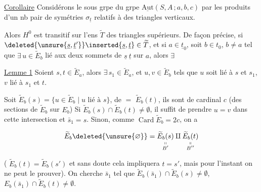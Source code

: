 \uline{Corollaire} Considérons le sous grpe  du grpe  $\underline{\mathrm{Aut}}(S,A\,;a,b,c)$   par les produits d'un nb pair de symétries $\sigma_{\underline t}$ relatifs à des triangles verticaux.

Alors $H^0$ est transitif sur l'ens $\widetilde T$ des triangles supérieurs. De façon précise, si $\deleted{\unsure{\underline s,\underline t'}}\inserted{\underline s,\underline t}\in\widetilde T$, et si $a\in\underline t_0$, soit  $b\in t_0$, $b\neq a$ tel que $\exists\,u\in\widetilde E_b$ lié aux deux sommets  de $\underline s\ \underline t$ sur $a$, alors $\exists$



\uline{Lemme 1}  Soient $s,t\in\widetilde E_a$, alors $\exists\,s_1\in\widetilde E_a$, et $u,v\in\widetilde E_b$ tels que $u$ soit lié à $s$ et $s_1$, $v$ lié à $s_1$ et $t$.


Soit $\widetilde E_{b}(s)=\{u\in\widetilde E_b\mid u\text{ lié à }s\}$, de $=$ $\widetilde E_b(t)$, ils sont de cardinal $c$ (des sections de $\widetilde E_b$ sur $E_b$) Si $\widetilde E_b(s)\cap\widetilde E_b(t)\neq\emptyset$, il suffit de prendre $u=v$  dans cette intersection et $\bar s_1=s$. Sinon, comme $\operatorname{Card}\widetilde E_b=2c$, on a

\[ \widetilde E_b\deleted{\unsure{\varnothing}}=\underset{\substack{\shortparallel\\ B'}}{\widetilde E_b(s)}\amalg\underset{\substack{\shortparallel\\ B''}}{\widetilde E_b(t)} \]

( $\widetilde E_b(t)=\widetilde E_b(s')$ et sans doute cela impliquera $t=s'$, mais pour l'instant on ne peut le prouver). On cherche  $\bar s_1$ tel que $\widetilde E_b(\bar s_1)\cap\widetilde E_b(s)\neq\emptyset$, $E_b(\bar s_1)\cap\widetilde E_b(t)\neq\emptyset$.

